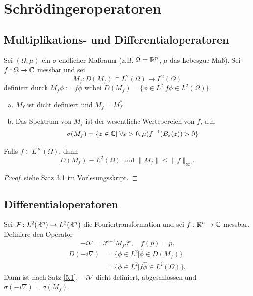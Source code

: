 \documentclass{mycourse}
\begin{document}
\chapter{Schrödingeroperatoren}\label{5}

\section{Multiplikations- und Differentialoperatoren}
Sei $( \Omega, \mu)$ ein $\sigma$-endlicher Maßraum (z.B. $\Omega = \mathbb{R}^n$, $\mu$ das Lebesgue-Maß). Sei $f: \Omega \to \mathbb{C}$ messbar und sei
\[
M_f : D(M_f) \subset L^2( \Omega) \to L^2( \Omega)
\]
definiert durch $M_f \phi:= f\phi$ wobei $D(M_f)=\{ \phi \in L^2| f\phi \in L^2(\Omega)\}.$

\begin{st}\label{5.1}
\begin{enumerate}[a)]
\item $M_f$ ist dicht definiert und $M_{\bar f} = M_f^*$
\item Das Spektrum von $M_f$ ist der wesentliche Wertebereich von $f$, d.h.
\[
\sigma(M_f) =\{z\in \C| \forall \eps >0, \mu(f^{-1} (B_\eps (z))>0\}
\]
\end{enumerate}
\begin{nt*}
Falls $f\in L^\infty(\Omega)$, dann 
\[
D(M_f) = L^2(\Omega) \text{ und } \| M_f\| \le \| f\|_\infty.
\]
\end{nt*}
\end{st}
\begin{proof}
siehe Satz 3.1 im Vorlesungsskript.
\end{proof}

\section{Differentialoperatoren}
Sei $\mathcal F: L^2(\mathbb{R}^n) \to L^2(\mathbb{R}^n)$ die Fouriertransformation und sei $f: \mathbb{R}^n \to \mathbb{C}$ messbar. Definiere den Operator
\[
-i \nabla = \mathcal F^{-1} M_f \mathcal F, \quad f(p)=p.
\]
\begin{align*}
D(-i \nabla)&=\{\phi \in L^2| \hat \phi \in D(M_f)\}\\
&=\{ \phi \in L^2| f \hat \phi \in L^2( \Omega)\}.
\end{align*}
Dann ist nach Satz \ref{5.1}, $-i \nabla$ dicht definiert, abgeschlossen und $\sigma(-i\nabla)=\sigma(M_f)$.
\end{document}
